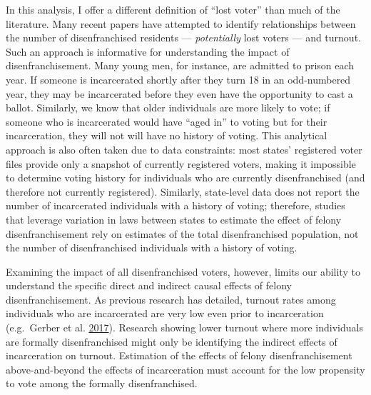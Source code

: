 \documentclass[12pt,]{article}
\begin{document}
In this analysis, I offer a different definition of ``lost voter'' than much of the literature. Many recent papers have attempted to identify relationships between the number of disenfranchised residents --- \emph{potentially} lost voters --- and turnout. Such an approach is informative for understanding the impact of disenfranchisement. Many young men, for instance, are admitted to prison each year. If someone is incarcerated shortly after they turn 18 in an odd-numbered year, they may be incarcerated before they even have the opportunity to cast a ballot. Similarly, we know that older individuals are more likely to vote; if someone who is incarcerated would have ``aged in'' to voting but for their incarceration, they will not will have no history of voting. This analytical approach is also often taken due to data constraints: most states' registered voter files provide only a snapshot of currently registered voters, making it impossible to determine voting history for individuals who are currently disenfranchised (and therefore not currently registered). Similarly, state-level data does not report the number of incarcerated individuals with a history of voting; therefore, studies that leverage variation in laws between states to estimate the effect of felony disenfranchisement rely on estimates of the total disenfranchised population, not the number of disenfranchised individuals with a history of voting.

Examining the impact of all disenfranchised voters, however, limits our ability to understand the specific direct and indirect causal effects of felony disenfranchisement. As previous research has detailed, turnout rates among individuals who are incarcerated are very low even prior to incarceration (e.g.~Gerber et al. \protect\hyperlink{ref-Gerber2017}{2017}). Research showing lower turnout where more individuals are formally disenfranchised might only be identifying the indirect effects of incarceration on turnout. Estimation of the effects of felony disenfranchisement above-and-beyond the effects of incarceration must account for the low propensity to vote among the formally disenfranchised.
\end{document}
